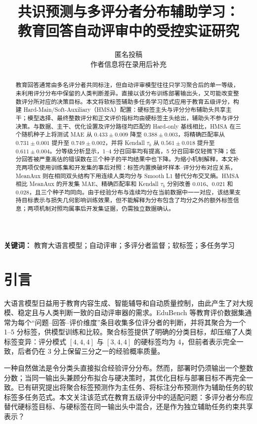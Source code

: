 \documentclass[UTF8,fontset=fandol,a4paper,11pt]{ctexart}
\title{\heiti\bfseries 共识预测与多评分者分布辅助学习：\\教育回答自动评审中的受控实证研究}
\author{匿名投稿\\作者信息将在录用后补充}
\date{}
\begin{document}
\pagestyle{plain}
\maketitle

\begin{abstract}
教育回答通常由多名评分者共同标注，但自动评审模型往往只学习聚合后的单一等级，未利用评分分布中保留的人类判断差异。直接以该分布训练部署输出头，又可能改变整数评分所对应的决策目标。本文将软标签辅助多任务学习范式应用于教育五级评分，构建 Hard-Main/Soft-Auxiliary（HMSA）配置：硬标签主头与评分分布辅助头共享主干；模型选择、最终整数评分和正文评价指标均由硬标签主头给出，辅助头不参与评分决策。与数据、主干、优化设置及评分路径均匹配的 Hard-only 基线相比，HMSA 在三个随机种子上将测试 MAE 从 $0.433\pm0.009$ 降至 $0.388\pm0.003$，将精确匹配率从 $0.731\pm0.001$ 提升至 $0.749\pm0.002$，并将 Kendall $\tau_b$ 从 $0.561\pm0.018$ 提升至 $0.611\pm0.004$。分等级分析显示，1--4 分召回率均有提高，5 分召回率仅轻微下降；低分回答被严重高估的错误数在三个种子的平均结果中也下降。为缩小机制解释，本文补充两项仅使用训练集和开发集的事后对照：标签内置换破坏样本--评分分布对应关系，MeanAux 则在相同双头结构下用连续人类均分与 Smooth L1 替代分布交叉熵。HMSA 相比 MeanAux 的开发集 MAE、精确匹配率和 Kendall $\tau_b$ 分别改善 0.016、0.021 和 0.028，且三个种子均同向。由于经验分布与连续均分在当前数据中一一对应，该结果支持目标表示与损失几何影响训练效果，但不能解释为分布包含了均分之外的额外标签信息；两项机制对照均属事后开发集证据，仍需独立数据确认。
\end{abstract}

\noindent\textbf{关键词：} 教育大语言模型；自动评审；多评分者监督；软标签；多任务学习

\section{引言}

大语言模型日益用于教育内容生成、智能辅导和自动质量控制，由此产生了对大规模、稳定且与人类判断一致的自动评审器的需求。EduBench 等教育评价数据集通常为每个“问题--回答--评价维度”条目收集多位评分者的判断，并将其聚合为一个 1--5 分标签，供模型训练和比较\cite{edubench}。聚合标签提供了明确的分类目标，却压缩了人类标签变异\cite{plank2022,davani2022}：评分模式 $[4,4,4]$ 与 $[3,4,4]$ 的硬标签均为 4，但前者表示完全一致，后者仍在 3 分上保留三分之一的经验概率质量。

一种自然做法是令分类头直接拟合经验评分分布。然而，部署时仍须输出一个整数分数；当同一输出头兼顾分布拟合与硬决策时，其优化目标与部署目标不再完全一致。已有研究提出将聚合标签预测作为主任务、将标注分布预测作为辅助任务的软标签多任务范式\cite{fornaciari2021}。本文关注该范式在教育五级评分中的适配问题：多评分者分布应替代硬标签目标、与硬标签在同一输出头中混合，还是作为独立辅助任务约束共享表示？
\end{document}
